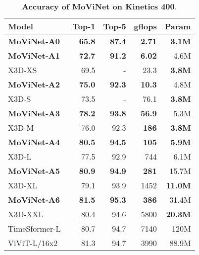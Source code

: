 \documentclass[final]{cvpr}
\newcommand{\ournet}{MoViNet\xspace} \newcommand{\ournets}{\ournet{}s\xspace}
\begin{document}
\begin{table}[tbp]
    \newcommand{\frameinput}[2]{#1#2}
    \begin{center}
\footnotesize
    \begin{tabularx}{0.8\columnwidth}{@{}Xrrrr@{}}
    \toprule
        \sc Model & \sc Top-1 & \sc Top-5 & \sc gflops & \sc Param \\
    \midrule
        \bf \ournet-A0 & \bf 65.8 & \bf 87.4 & \bf 2.71 & \bf 3.1M \\
    \midrule
        \bf \ournet-A1 & \bf 72.7 & \bf 91.2 & \bf 6.02 & 4.6M \\
        X3D-XS \cite{feichtenhofer2020x3d} & 69.5 & - & 23.3 & \bf 3.8M \\
    \midrule
        \bf \ournet-A2 & \bf 75.0 & \bf 92.3 & \bf 10.3 & 4.8M \\
        X3D-S \cite{feichtenhofer2020x3d} & 73.5 & - & 76.1 & \bf 3.8M \\
    \midrule
        \bf \ournet-A3 & \bf 78.2 & \bf 93.8 & \bf 56.9 & 5.3M \\
        X3D-M \cite{feichtenhofer2020x3d} & 76.0 & 92.3 & \bf 186 & \bf 3.8M \\
    \midrule
        \bf \ournet-A4 & \bf 80.5 & \bf 94.5 & \bf 105 & \bf 5.9M \\
        X3D-L \cite{feichtenhofer2020x3d} & 77.5 & 92.9 & 744 & 6.1M \\
    \midrule
        \bf \ournet-A5 & \bf 80.9 & \bf 94.9 & \bf 281 & 15.7M \\
        X3D-XL \cite{feichtenhofer2020x3d} & 79.1 & 93.9 & 1452 & \bf 11.0M \\
    \midrule
        \bf \ournet-A6 & \bf 81.5 & \bf 95.3 & \bf 386 & 31.4M \\
        X3D-XXL~\cite{feichtenhofer2020x3d} & 80.4 & 94.6 & 5800 & \bf 20.3M \\
        TimeSformer-L~\cite{bertasius2021space} & 80.7 & 94.7 & 7140 & 120M \\
        ViViT-L/16x2~\cite{arnab2021vivit} & 81.3 & 94.7 & 3990 & 88.9M \\
    \bottomrule
    \end{tabularx}
\end{center}
    \caption{
        {\bf Accuracy of \ournet on Kinetics 400}.
    }
    \label{table:k400-comparison}
\end{table}
\end{document}
